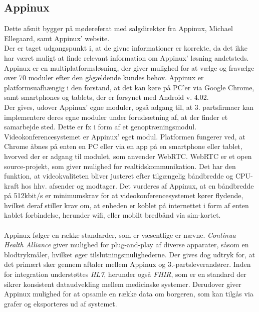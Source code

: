 \subsection{Appinux}
Dette afsnit bygger på mødereferat med salgdirektør fra Appinux, Michael Ellegaard\cite{moedeappinux}, samt Appinux' website\cite{appinuxwebsite}.\\Der er taget udgangspunkt i, at de givne informationer er korrekte, da det ikke har været muligt at finde relevant information om Appinux' løsning andetsteds.\\
Appinux er en multiplatformsløsning, der giver mulighed for at vælge og fravælge over 70 moduler efter den gågældende kundes behov. Appinux er platformsuafhængig i den forstand, at det kan køre på PC'er via Google Chrome, samt  smartphones og tablets, der er forsynet med Android v. 4.02.\\Der gives, udover Appinux' egne moduler, også adgang til, at 3. partsfirmaer kan implementere deres egne moduler under forudsætning af, at der finder et samarbejde sted. Dette er fx i form af et genoptræningsmodul.\\Videokonferencesystemet er Appinux' eget modul. Platformen fungerer ved, at Chrome åbnes på enten en PC eller via en app på en smartphone eller tablet, hvorved der er adgang til modulet, som anvender WebRTC. WebRTC er et open source-projekt, som giver mulighed for realtidskommunikation\cite{webrtchjemmeside}. Det har den funktion, at videokvaliteten bliver justeret efter tilgængelig båndbredde og CPU-kraft hos hhv. afsender og modtager. Det vurderes af Appinux, at en båndbredde på 512kbit/s er minimumskrav for at videokonferencesystemet kører flydende, hvilket deraf stiller krav om, at enheden er koblet på internettet i form af enten kablet forbindelse, herunder wifi, eller mobilt bredbånd via sim-kortet.
\\ \\
Appinux følger en række standarder, som er væsentlige   er nævne. \textit{Continua Health Alliance} giver mulighed for plug-and-play af diverse apparater, såsom en blodtrykmåler, hvilket øger tilslutningsmulighederne. Der gives dog udtryk for, at det primært sker gennem aftaler mellem Appinux og 3.-partsleverandører. Inden for integration understøttes \textit{HL7}, herunder også \textit{FHIR}, som er en standard der sikrer konsistent dataudvekling mellem medicinske systemer. Derudover giver Appinux mulighed for at opsamle en række data om borgeren, som kan tilgås via grafer og eksporteres ud af systemet.

